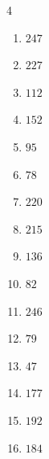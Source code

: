 \begin{multicols}{4}
\begin{enumerate}
  \item $247$


  \item $227$


  \item $112$


  \item $152$


  \item $95$


\columnbreak %

  \item $78$


  \item $220$


  \item $215$


  \item $136$


  \item $82$


  \item $246$


  \item $79$


  \item $47$


  \item $177$


  \item $192$


  \item $184$


\end{enumerate}
\end{multicols}
